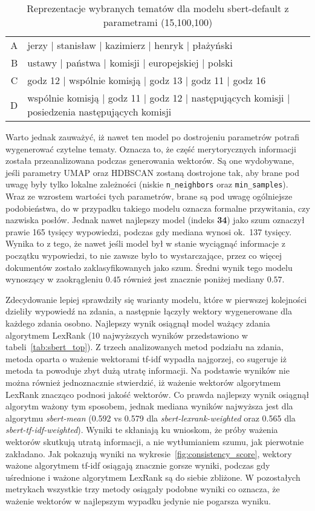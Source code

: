 	\begin{table}[htb]
		\caption{Reprezentacje wybranych tematów dla modelu sbert-default z parametrami (15,100,100)}\label{tab:sbert_default_topics} %
		\centering
		\small
		\begin{tabularx}{\textwidth}{rl}
			\toprule
			A & jerzy | stanisław | kazimierz | henryk | płażyński \\
			B & ustawy | państwa | komisji | europejskiej | polski \\
			C & godz 12 | wspólnie komisją | godz 13 | godz 11 | godz 16 \\
			D & wspólnie komisją | godz 11 | godz 12 | następujących komisji | posiedzenia następujących komisji \\
			\bottomrule
		\end{tabularx}
	\end{table}

	Warto jednak zauważyć, iż nawet ten model po dostrojeniu parametrów potrafi wygenerować czytelne tematy.
	Oznacza to, że część merytorycznych informacji została przeanalizowana podczas generowania wektorów.
	Są one wydobywane, jeśli parametry UMAP oraz HDBSCAN zostaną dostrojone tak,
		aby brane pod uwagę były tylko lokalne zależności (niskie \verb|n_neighbors| oraz \verb|min_samples|).
	Wraz ze wzrostem wartości tych parametrów, brane są pod uwagę ogólniejsze podobieństwa,
		do w przypadku takiego modelu oznacza formalne przywitania, czy nazwiska posłów.
	Jednak nawet najlepszy model (indeks \textbf{34}) jako szum oznaczył prawie 165 tysięcy wypowiedzi, podczas gdy mediana wynosi ok.~137 tysięcy.
	Wynika to z tego, że nawet jeśli model był w stanie wyciągnąć informacje z początku wypowiedzi, to nie zawsze było to wystarczające, przez co więcej dokumentów zostało zaklasyfikowanych jako szum.
	Średni wynik tego modelu wynoszący w zaokrągleniu \(0.45\) również jest znacznie poniżej mediany \(0.57\).

	Zdecydowanie lepiej sprawdziły się warianty modelu, które w pierwszej kolejności dzieliły wypowiedź na zdania, a następnie łączyły wektory wygenerowane dla każdego zdania osobno.
	Najlepszy wynik osiągnął model ważący zdania algorytmem LexRank (10 najwyższych wyników przedstawiono w tabeli~\ref{tab:sbert_top}).
	Z trzech analizowanych metod podziału na zdania, metoda oparta o ważenie wektorami tf-idf wypadła najgorzej, co sugeruje iż metoda ta powoduje zbyt dużą utratę informacji.
	Na podstawie wyników nie można również jednoznacznie stwierdzić, iż ważenie wektorów algorytmem LexRank znacząco podnosi jakość wektorów.
	Co prawda najlepszy wynik osiągnął algorytm ważony tym sposobem,
		jednak mediana wyników najwyższa jest dla algorytmu \emph{sbert-mean} (0.592 vs 0.579 dla \emph{sbert-lexrank-weighted} oraz 0.565 dla \emph{sbert-tf-idf-weighted}).
	Wyniki te skłaniają ku wnioskom, że próby ważenia wektorów skutkują utratą informacji, a nie wytłumianiem szumu, jak pierwotnie zakładano.
	Jak pokazują wyniki na wykresie~\ref{fig:consistency_score}, wektory ważone algorytmem tf-idf osiągają znacznie gorsze wyniki,
		podczas gdy uśrednione i ważone algorytmem LexRank są do siebie zbliżone.
	W pozostałych metrykach wszystkie trzy metody osiągały podobne wyniki co oznacza, że ważenie wektorów w najlepszym wypadku jedynie nie pogarsza wyniku.
	
